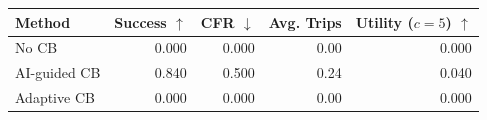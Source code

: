 \begin{tabular}{lrrrr}
\toprule
Method & Success $\uparrow$ & CFR $\downarrow$ & Avg. Trips & Utility ($c=5$) $\uparrow$ \\
\midrule
No CB & 0.000 & 0.000 & 0.00 & 0.000 \\
AI-guided CB & 0.840 & 0.500 & 0.24 & 0.040 \\
Adaptive CB & 0.000 & 0.000 & 0.00 & 0.000 \\
\bottomrule
\end{tabular}
